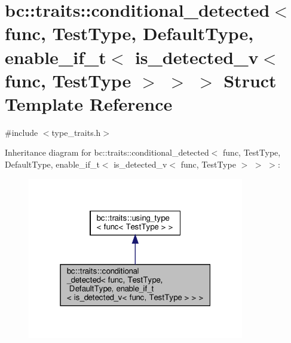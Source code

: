 \hypertarget{structbc_1_1traits_1_1conditional__detected_3_01func_00_01TestType_00_01DefaultType_00_01enable_bd91878b3704fd95a7d312facc7e7c31}{}\section{bc\+:\+:traits\+:\+:conditional\+\_\+detected$<$ func, Test\+Type, Default\+Type, enable\+\_\+if\+\_\+t$<$ is\+\_\+detected\+\_\+v$<$ func, Test\+Type $>$ $>$ $>$ Struct Template Reference}
\label{structbc_1_1traits_1_1conditional__detected_3_01func_00_01TestType_00_01DefaultType_00_01enable_bd91878b3704fd95a7d312facc7e7c31}


{\ttfamily \#include $<$type\+\_\+traits.\+h$>$}



Inheritance diagram for bc\+:\+:traits\+:\+:conditional\+\_\+detected$<$ func, Test\+Type, Default\+Type, enable\+\_\+if\+\_\+t$<$ is\+\_\+detected\+\_\+v$<$ func, Test\+Type $>$ $>$ $>$\+:\nopagebreak
\begin{figure}[H]
\begin{center}
\leavevmode
\includegraphics[width=268pt]{structbc_1_1traits_1_1conditional__detected_3_01func_00_01TestType_00_01DefaultType_00_01enable_537f73168fb7e7256146e60f8055e20b}
\end{center}
\end{figure}


